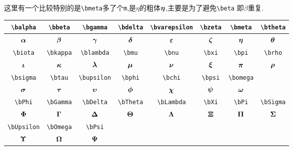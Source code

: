 \documentclass[lang=cn,12pt,scheme=chinese,mode=simple,black]{elegantbook}
\begin{document}
这里有一个比较特别的是\verb|\bmeta|多了个\verb|m|,是$\eta$的粗体$\bm{\eta}$,主要是为了避免\verb|\beta| 即$\beta$重复.
\begin{center}
\renewcommand{\arraystretch}{1.4}
\begin{tabular}{|c|c|c|c|c|c|c|c|}
\hline\hline
\verb|\balpha| & \verb|\bbeta| & \verb|\bgamma| & \verb|\bdelta| & \verb|\bvarepsilon| & \verb|\bzeta| & \verb|\bmeta| & \verb|\btheta| \\
\hline
$\bm{\alpha}$ & $\bm{\beta}$ & $\bm{\gamma}$ & $\bm{\delta}$ & $\bm{\varepsilon}$ & $\bm{\zeta}$ & $\bm{\eta}$ & $\bm{\theta}$ \\
\hline\hline
\verb|\biota| & \verb|\bkappa| & \verb|\blambda| & \verb|\bmu| & \verb|\bnu| & \verb|\bxi| & \verb|\bpi| & \verb|\brho|\\
\hline
$\bm{\iota}$ & $\bm{\kappa}$ & $\bm{\lambda}$ & $\bm{\mu}$ & $\bm{\nu}$ & $\bm{\xi}$ & $\bm{\pi}$ & $\bm{\rho}$ \\
\hline\hline
\verb|\bsigma| & \verb|\btau| & \verb|\bupsilon| & \verb|\bphi| & \verb|\bchi| & \verb|\bpsi| & \verb|\bomega| &\\ 
\hline
$\bm{\sigma}$ & $\bm{\tau}$ & $\bm{\upsilon}$ & $\bm{\phi}$ & $\bm{\chi}$ & $\bm{\psi}$ & $\bm{\omega}$ &  \\
\hline\hline
\verb|\bPhi| & \verb|\bGamma| & \verb|\bDelta|&\verb|\bTheta| & \verb|\bLambda| & \verb|\bXi| & \verb|\bPi| & \verb|\bSigma| \\
\hline
$\bm{\Phi}$ & $\bm{\Gamma}$ & $\bm{\Delta}$ &$\bm{\Theta}$ & $\bm{\Lambda}$ & $\bm{\Xi}$ & $\bm{\Pi}$ & $\bm{\Sigma}$  \\
\hline\hline
 \verb|\bUpsilon|&\verb|\bOmega| & \verb|\bPsi| & & & & &\\
\hline
 $\bm{\Upsilon}$&$\bm{\Omega}$ & $\bm{\Psi}$ & & & & &\\
\hline\hline
\end{tabular}
\end{center}
\end{document}

